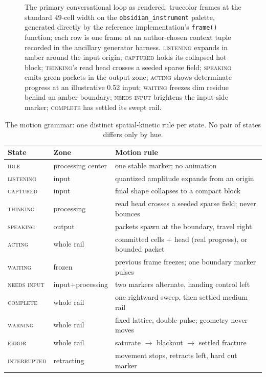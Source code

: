 \documentclass[11pt]{article}
\newcommand{\railstate}[1]{\textsc{#1}}
\begin{document}
\begin{figure}[t]
\centering
{\setlength{\fboxsep}{10pt}%
\colorbox{railbg}{\parbox{\dimexpr\linewidth-20pt\relax}{%
\railfont\footnotesize
}}}
\caption{The primary conversational loop as rendered: truecolor frames at
the standard 49-cell width on the \texttt{obsidian\_instrument} palette,
generated directly by the reference implementation's \texttt{frame()}
function; each row is one frame at an author-chosen context tuple
recorded in the ancillary generator harness.
\railstate{listening} expands in amber around the input origin;
\railstate{captured} holds its collapsed hot block; \railstate{thinking}'s
read head crosses a seeded sparse field; \railstate{speaking} emits green
packets in the output zone; \railstate{acting} shows determinate progress at an illustrative 0.52
input; \railstate{waiting} freezes dim residue behind an amber
boundary; \railstate{needs input} brightens the input-side marker;
\railstate{complete} has settled its swept rail.}
\label{fig:loop}
\end{figure}

\begin{table}[t]
\centering
\small
\begin{tabular}{lll}
\toprule
State & Zone & Motion rule \\
\midrule
\railstate{idle}        & processing center & one stable marker; no animation \\
\railstate{listening}   & input             & quantized amplitude expands from an origin \\
\railstate{captured}    & input             & final shape collapses to a compact block \\
\railstate{thinking}    & processing        & read head crosses a seeded sparse field; never bounces \\
\railstate{speaking}    & output            & packets spawn at the boundary, travel right \\
\railstate{acting}      & whole rail        & committed cells + head (real progress), or bounded packet \\
\railstate{waiting}     & frozen            & previous frame freezes; one boundary marker pulses \\
\railstate{needs input} & input+processing  & two markers alternate, handing control left \\
\railstate{complete}    & whole rail        & one rightward sweep, then settled medium rail \\
\railstate{warning}     & whole rail        & fixed lattice, double-pulse; geometry never moves \\
\railstate{error}       & whole rail        & saturate $\rightarrow$ blackout $\rightarrow$ settled fracture \\
\railstate{interrupted} & retracting        & movement stops, retracts left, hard cut marker \\
\bottomrule
\end{tabular}
\caption{The motion grammar: one distinct spatial-kinetic rule per state.
No pair of states differs only by hue.}
\label{tab:grammar}
\end{table}
\end{document}
